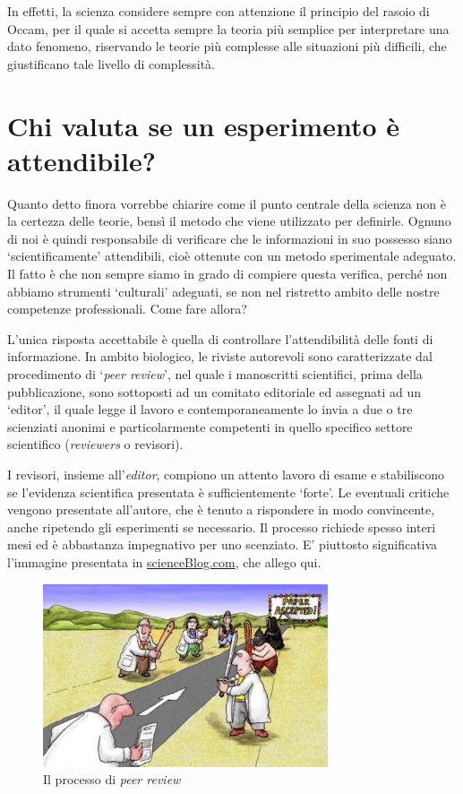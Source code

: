 \documentclass[a4paper,12pt,oneside]{book}
\begin{document}
In effetti, la scienza considere sempre con attenzione il principio del
rasoio di Occam, per il quale si accetta sempre la teoria più semplice
per interpretare una dato fenomeno, riservando le teorie più complesse
alle situazioni più difficili, che giustificano tale livello di
complessità.

\section{Chi valuta se un esperimento è
attendibile?}\label{chi-valuta-se-un-esperimento-e-attendibile}

Quanto detto finora vorrebbe chiarire come il punto centrale della
scienza non è la certezza delle teorie, bensì il metodo che viene
utilizzato per definirle. Ognuno di noi è quindi responsabile di
verificare che le informazioni in suo possesso siano `scientificamente'
attendibili, cioè ottenute con un metodo sperimentale adeguato. Il fatto
è che non sempre siamo in grado di compiere questa verifica, perché non
abbiamo strumenti `culturali' adeguati, se non nel ristretto ambito
delle nostre competenze professionali. Come fare allora?

L'unica risposta accettabile è quella di controllare l'attendibilità
delle fonti di informazione. In ambito biologico, le riviste autorevoli
sono caratterizzate dal procedimento di `\emph{peer review}', nel quale
i manoscritti scientifici, prima della pubblicazione, sono sottoposti ad
un comitato editoriale ed assegnati ad un `editor', il quale legge il
lavoro e contemporaneamente lo invia a due o tre scienziati anonimi e
particolarmente competenti in quello specifico settore scientifico
(\emph{reviewers} o revisori).

I revisori, insieme all'\emph{editor}, compiono un attento lavoro di
esame e stabiliscono se l'evidenza scientifica presentata è
sufficientemente `forte'. Le eventuali critiche vengono presentate
all'autore, che è tenuto a rispondere in modo convincente, anche
ripetendo gli esperimenti se necessario. Il processo richiede spesso
interi mesi ed è abbastanza impegnativo per uno scenziato. E' piuttosto
significativa l'immagine presentata in
\href{http://scienceblogs.com/startswithabang/2013/06/07/the-4-jobs-of-a-referee-in-peer-review/}{scienceBlog.com},
che allego qui.

\begin{figure}
\centering
\includegraphics[width=0.75000\textwidth]{_images/PeerReview.jpg}
\caption{Il processo di \emph{peer review}}
\end{figure}
\end{document}
